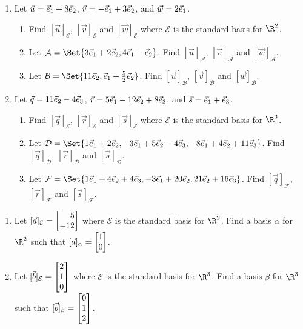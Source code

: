 \begin{exercises}
	\begin{problist}

		\prob
		\begin{enumerate}

			\item Let $\vec u={\vec e_1}+8{\vec e_2}$, $\vec v=-{\vec e_1}+ 3{\vec e_2}$, and $\vec w=2{\vec e_1}$.

			\begin{enumerate}
				\item Find $[\vec u]_{\mathcal E}$, $[\vec v]_{\mathcal E}$ and
				$[\vec w]_{\mathcal E}$ where $\mathcal E$ is the standard basis for $\R^2$.
				\item Let $\mathcal A=\Set{3\xhat+2\yhat,4\xhat-\yhat}$.
				Find $[\vec u]_{\mathcal A}$, $[\vec v]_{\mathcal A}$ and
				$[\vec w]_{\mathcal A}$.
				\item Let $\mathcal B=\Set{11\yhat,\xhat+\frac{5}{2}\yhat}$.
				Find $[\vec u]_{\mathcal B}$, $[\vec v]_{\mathcal B}$ and
				$[\vec w]_{\mathcal B}$.
			\end{enumerate}

			\item Let $\vec q=11{\vec e_2}-4{\vec e_3}$, $\vec r=5{\vec e_1}-12{\vec e_2}+8{\vec e_3}$, and $\vec s={\vec e_1}+{\vec e_3}$.

			\begin{enumerate}
				\item Find $[\vec q]_{\mathcal E}$, $[\vec r]_{\mathcal E}$ and
				$[\vec s]_{\mathcal E}$ where $\mathcal E$ is the standard basis for $\R^3$.
				\item Let $\mathcal D=\Set{1\xhat+2\yhat,-3\xhat+5\yhat-4\zhat,-8\xhat+4\yhat+11\zhat}$.
				Find $[\vec q]_{\mathcal D}$, $[\vec r]_{\mathcal D}$ and
				$[\vec s]_{\mathcal D}$.
				\item Let $\mathcal F=\Set{1\xhat+4\yhat+4\zhat,-3\xhat+20\yhat,21\yhat+16\zhat}$.
				Find $[\vec q]_{\mathcal F}$, $[\vec r]_{\mathcal F}$ and
				$[\vec s]_{\mathcal F}$.
			\end{enumerate}
		\end{enumerate}

		\prob
		\begin{enumerate}
			\item Let $[\vec a]_{\mathcal E}=\mat{5\\-12}$ where $\mathcal E$ is the standard basis
			for $\R^2$. Find a basis $\alpha$ for $\R^2$ such that $[\vec a]_{\alpha}=\mat{1\\0}$.
			\item Let $[\vec b]_{\mathcal E}=\mat{2\\1\\0}$ where $\mathcal E$ is the standard basis
			for $\R^3$. Find a basis $\beta$ for $\R^3$ such that $[\vec b]_{\beta}=\mat{0\\1\\2}$.
		\end{enumerate}


\end{problist}
\end{exercises}

